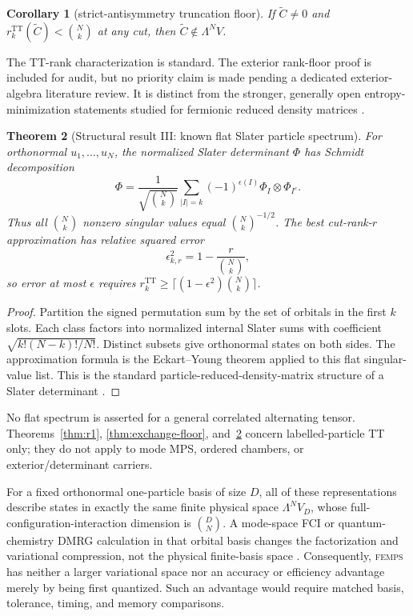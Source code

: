 \documentclass[11pt]{article}
\newtheorem{theorem}{Theorem}[section]
\newtheorem{corollary}[theorem]{Corollary}
\theoremstyle{definition}
\newcommand{\TT}{\mathrm{TT}}
\newcommand{\FEMPS}{\textnormal{\textsc{femps}}}
\begin{document}
\begin{corollary}[strict-antisymmetry truncation floor]
If $\widetilde C\ne0$ and
$r_k^{\TT}(\widetilde C)<\binom{N}{k}$ at any cut, then
$\widetilde C\notin\Lambda^N V$.
\end{corollary}

The TT-rank characterization is standard.  The exterior rank-floor proof is
included for audit, but no priority claim is made pending a dedicated exterior-
algebra literature review.  It is distinct from the stronger, generally open
entropy-minimization statements studied for fermionic reduced density
matrices \cite{CarlenLiebReuvers2016FermionicEntropy,
LiWaintal2026FirstQuantization}.

\begin{theorem}[Structural result III: known flat Slater particle spectrum]
For orthonormal $u_1,\ldots,u_N$, the normalized Slater determinant $\Phi$
has Schmidt decomposition
\[
 \Phi=\frac{1}{\sqrt{\binom{N}{k}}}
 \sum_{|I|=k}(-1)^{\epsilon(I)}\Phi_I\otimes\Phi_{I^c}.
\]
Thus all $\binom{N}{k}$ nonzero singular values equal
$\binom{N}{k}^{-1/2}$.  The best cut-rank-$r$ approximation has relative
squared error
\[
 \epsilon_{k,r}^2=1-\frac{r}{\binom{N}{k}},
\]
so error at most $\epsilon$ requires
$r_k^{\TT}\ge\lceil(1-\epsilon^2)\binom{N}{k}\rceil$.
\label{thm:r2}
\end{theorem}

\begin{proof}
Partition the signed permutation sum by the set of orbitals in the first $k$
slots.  Each class factors into normalized internal Slater sums with coefficient
$\sqrt{k!(N-k)!/N!}$.  Distinct subsets give orthonormal states on both sides.
The approximation formula is the Eckart--Young theorem applied to this flat
singular-value list.  This is the standard particle-reduced-density-matrix
structure of a Slater determinant \cite{Coleman1963FermionRDM}.
\end{proof}

No flat spectrum is asserted for a general correlated alternating tensor.
Theorems~\ref{thm:r1}, \ref{thm:exchange-floor}, and~\ref{thm:r2} concern
labelled-particle TT only; they do
not apply to mode MPS, ordered chambers, or exterior/determinant carriers.

For a fixed orthonormal one-particle basis of size $D$, all of these
representations describe states in exactly the same finite physical space
$\Lambda^N V_D$, whose full-configuration-interaction dimension is
$\binom{D}{N}$.  A mode-space FCI or quantum-chemistry DMRG calculation in
that orbital basis changes the factorization and variational compression, not
the physical finite-basis space \cite{ChanSharma2011DMRG,LiChan2016HSMPS}.
Consequently, \FEMPS{} has neither a larger variational space nor an accuracy
or efficiency advantage merely by being first quantized.  Such an advantage
would require matched basis, tolerance, timing, and memory comparisons.
\end{document}
